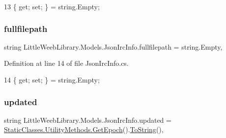 \begin{DoxyCode}
13 \{ \textcolor{keyword}{get}; \textcolor{keyword}{set}; \} = \textcolor{keywordtype}{string}.Empty;
\end{DoxyCode}
\mbox{\label{class_little_weeb_library_1_1_models_1_1_json_irc_info_aacacd27f11b2a0a075696b51d2a2a068}} 
\subsubsection{\texorpdfstring{fullfilepath}{fullfilepath}}
{\footnotesize\ttfamily string Little\+Weeb\+Library.\+Models.\+Json\+Irc\+Info.\+fullfilepath = string.\+Empty\hspace{0.3cm}{\ttfamily [get]}, {\ttfamily [set]}}



Definition at line 14 of file Json\+Irc\+Info.\+cs.


\begin{DoxyCode}
14 \{ \textcolor{keyword}{get}; \textcolor{keyword}{set}; \} = \textcolor{keywordtype}{string}.Empty;
\end{DoxyCode}
\mbox{\label{class_little_weeb_library_1_1_models_1_1_json_irc_info_a3c8dbe0b5446adae3c11792df96ea7df}} 
\subsubsection{\texorpdfstring{updated}{updated}}
{\footnotesize\ttfamily string Little\+Weeb\+Library.\+Models.\+Json\+Irc\+Info.\+updated = \mbox{\hyperlink{class_little_weeb_library_1_1_static_classes_1_1_utility_methods_a12336d9e64983ddabaad8950486fafb2}{Static\+Classes.\+Utility\+Methods.\+Get\+Epoch}}().\mbox{\hyperlink{class_little_weeb_library_1_1_models_1_1_json_irc_info_a7a9635e9efc6d62801ec57bdb90c1cee}{To\+String}}()\hspace{0.3cm}{\ttfamily [get]}, {\ttfamily [set]}}




